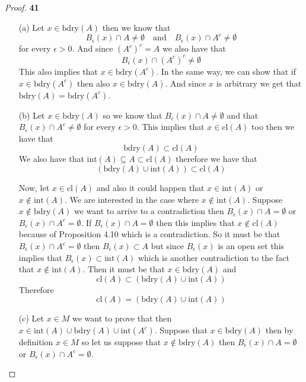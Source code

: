 \documentclass[11pt]{article}
\newcommand{\cl}{\text{cl}}
\newcommand{\bdry}{\text{bdry}}
\newcommand{\inter}{\text{int}}
\theoremstyle{definition}
\begin{document}
    \begin{proof}{\textbf{41}}
        \begin{itemize}
        \item [(a)] Let $x \in \bdry(A)$ then we know that
        $$B_{\epsilon}(x) \cap A \neq \emptyset \quad\text{and}\quad
        B_{\epsilon}(x) \cap A^c \neq \emptyset$$ 
        for every $\epsilon > 0$. And since $(A^c)^c = A$ we also have that
        $$B_{\epsilon}(x) \cap (A^c)^c \neq \emptyset$$
        This also implies that $x \in \bdry(A^c)$. In the same way, we can show
        that if $x \in \bdry(A^c)$ then also $x \in \bdry(A)$. And since $x$ is
        arbitrary we get that $\bdry(A) = \bdry(A^c)$.
        
        \item [(b)] Let $x \in \bdry(A)$ so we know that
        $B_{\epsilon}(x) \cap A \neq \emptyset$ and that
        $B_{\epsilon}(x) \cap A^c \neq \emptyset$
        for every $\epsilon > 0$. This implies that $x \in \cl(A)$ too then
        we have that
        $$\bdry(A) \subset \cl(A)$$
        We also have that $\inter(A) \subseteq A \subset \cl(A)$ therefore
        we have that
        $$(\bdry(A) \cup \inter(A)) \subset \cl(A)$$

        Now, let $x \in \cl(A)$ and also it could happen that
        $x \in \inter(A)$ or $x \not\in \inter(A)$.
        We are interested in the case where $x \not\in \inter(A)$. Suppose
        $x \not\in \bdry(A)$ we want to arrive to a contradiction then
        $B_{\epsilon}(x) \cap A = \emptyset$ or
        $B_{\epsilon}(x) \cap A^c = \emptyset$. If
        $B_{\epsilon}(x) \cap A = \emptyset$ then this implies that
        $x \not\in \cl(A)$ because of Proposition 4.10 which is a contradiction.
        So it must be that $B_{\epsilon}(x) \cap A^c = \emptyset$ then
        $B_{\epsilon}(x) \subset A$ but since $B_{\epsilon}(x)$ is an open set
        this implies that $B_{\epsilon}(x) \subset \inter(A)$ which is another
        contradiction to the fact that $x \not\in \inter(A)$. Then
        it must be that $x \in \bdry(A)$ and
        $$\cl(A) \subset (\bdry(A) \cup \inter(A))$$
        Therefore
        $$\cl(A) = (\bdry(A) \cup \inter(A))$$
        \item [(c)] Let $x \in M$ we want to prove that then
        $x \in \inter(A) \cup \bdry(A) \cup \inter(A^c)$. Suppose that
        $x \in \bdry(A)$ then by definition $x \in M$ so let us suppose that
        $x \not\in \bdry(A)$ then $B_{\epsilon}(x) \cap A = \emptyset$ or
        $B_{\epsilon}(x) \cap A^c = \emptyset$.
        

\end{itemize}
\end{proof}
\end{document}
